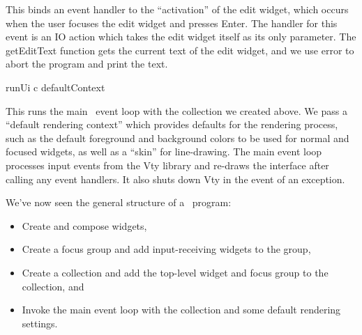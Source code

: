This binds an event handler to the “activation” of the edit widget,
which occurs when the user focuses the edit widget and presses Enter.
The handler for this event is an IO action which takes the edit widget
itself as its only parameter.  The getEditText function gets the current
text of the edit widget, and we use error to abort the program and print
the text.

\begin{haskellcode}
 runUi c defaultContext
\end{haskellcode}

This runs the main \vtyui\ event loop with the collection we created
above.  We pass a “default rendering context” which provides defaults
for the rendering process, such as the default foreground and
background colors to be used for normal and focused widgets, as well
as a “skin” for line-drawing.  The main event loop processes input
events from the Vty library and re-draws the interface after calling
any event handlers.  It also shuts down Vty in the event of an
exception.

We've now seen the general structure of a \vtyui\ program:
\begin{itemize}
\item Create and compose widgets,
\item Create a focus group and add input-receiving widgets to the group,
\item Create a collection and add the top-level widget and focus group
      to the collection, and
\item Invoke the main event loop with the collection and some default
      rendering settings.
\end{itemize}
